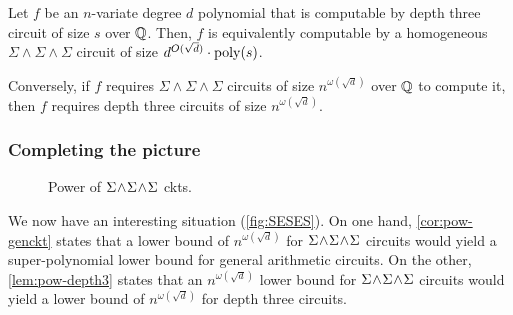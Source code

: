 \begin{lemma}\label{lem:pow-depth3}
Let $f$ be an $n$-variate degree $d$ polynomial that is computable by depth three circuit of size $s$ over $\mathbb{Q}$. Then, $f$ is equivalently computable by a homogeneous $\Sigma\!\wedge\!\Sigma\!\wedge\!\Sigma$ circuit of size $d^{O(\sqrt{d})}\cdot \mathrm{poly}(s)$. 

Conversely, if $f$ requires $\Sigma\!\wedge\!\Sigma\!\wedge\!\Sigma$ circuits of size $n^{\omega(\sqrt{d})}$ over $\mathbb{Q}$ to compute it, then $f$ requires depth three circuits of size $n^{\omega(\sqrt{d})}$. 
\end{lemma}

\subsubsection{Completing the picture}

\begin{figure}
\begin{center}
\end{center}
\caption{Power of $\Sigma\!\wedge\!\Sigma\!\wedge\!\Sigma$ ckts.}
\label{fig:SESES}
\end{figure}


We now have an interesting situation (\autoref{fig:SESES}). On one hand, \autoref{cor:pow-genckt} states that a lower bound of $n^{\omega(\sqrt{d})}$ for $\Sigma\!\wedge\!\Sigma\!\wedge\!\Sigma$ circuits would yield a super-polynomial lower bound for general arithmetic circuits. On the other, \autoref{lem:pow-depth3} states that an $n^{\omega(\sqrt{d})}$ lower bound for $\Sigma\!\wedge\!\Sigma\!\wedge\!\Sigma$ circuits would yield a lower bound of $n^{\omega(\sqrt{d})}$ for depth three circuits. 

